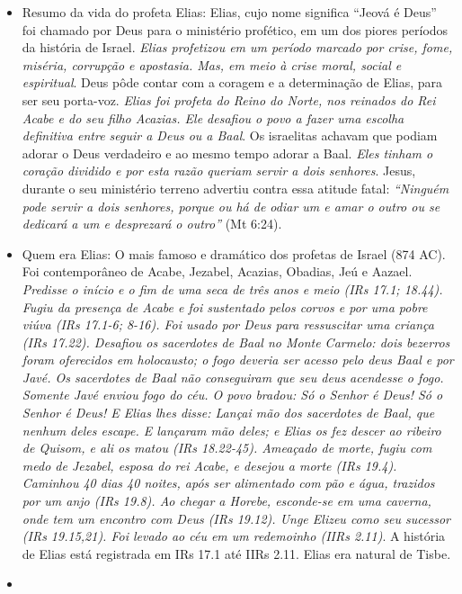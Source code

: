 \documentclass[
]{book}
\begin{document}
\begin{itemize}
\item
  Resumo da vida do profeta Elias: Elias, cujo nome significa ``Jeová é Deus'' foi chamado por Deus para o ministério profético, em um dos piores períodos da história de Israel. \emph{Elias profetizou em um período marcado por crise, fome, miséria, corrupção e apostasia. Mas, em meio à crise moral, social e espiritual}. Deus pôde contar com a coragem e a determinação de Elias, para ser seu porta-voz. \emph{Elias foi profeta do Reino do Norte, nos reinados do Rei Acabe e do seu filho Acazias. Ele desafiou o povo a fazer uma escolha definitiva entre seguir a Deus ou a Baal}. Os israelitas achavam que podiam adorar o Deus verdadeiro e ao mesmo tempo adorar a Baal. \emph{Eles tinham o coração dividido e por esta razão queriam servir a dois senhores}. Jesus, durante o seu ministério terreno advertiu contra essa atitude fatal: \emph{``Ninguém pode servir a dois senhores, porque ou há de odiar um e amar o outro ou se dedicará a um e desprezará o outro''} (Mt 6:24).
\item
  Quem era Elias: O mais famoso e dramático dos profetas de Israel (874 AC). Foi contemporâneo de Acabe, Jezabel, Acazias, Obadias, Jeú e Aazael. \emph{Predisse o início e o fim de uma seca de três anos e meio (IRs 17.1; 18.44). Fugiu da presença de Acabe e foi sustentado pelos corvos e por uma pobre viúva (IRs 17.1-6; 8-16). Foi usado por Deus para ressuscitar uma criança (IRs 17.22). Desafiou os sacerdotes de Baal no Monte Carmelo: dois bezerros foram oferecidos em holocausto; o fogo deveria ser acesso pelo deus Baal e por Javé. Os sacerdotes de Baal não conseguiram que seu deus acendesse o fogo. Somente Javé enviou fogo do céu. O povo bradou: Só o Senhor é Deus! Só o Senhor é Deus! E Elias lhes disse: Lançai mão dos sacerdotes de Baal, que nenhum deles escape. E lançaram mão deles; e Elias os fez descer ao ribeiro de Quisom, e ali os matou (IRs 18.22-45). Ameaçado de morte, fugiu com medo de Jezabel, esposa do rei Acabe, e desejou a morte (IRs 19.4). Caminhou 40 dias 40 noites, após ser alimentado com pão e água, trazidos por um anjo (IRs 19.8). Ao chegar a Horebe, esconde-se em uma caverna, onde tem um encontro com Deus (IRs 19.12). Unge Elizeu como seu sucessor (IRs 19.15,21). Foi levado ao céu em um redemoinho (IIRs 2.11)}. A história de Elias está registrada em IRs 17.1 até IIRs 2.11. Elias era natural de Tisbe.
\item

\end{itemize}
\end{document}

